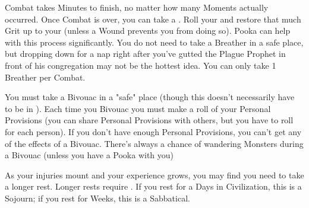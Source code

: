 {  



  Combat takes Minutes to finish, no matter how many Moments actually occurred.  Once Combat is over, you can take a .  Roll your \FLESH and restore that much Grit up to your \MAX (unless a Wound prevents you from doing so).  Pooka can help with this process significantly.  You do not need to take a Breather in a safe place, but dropping down for a nap right after you've gutted the Plague Prophet in front of his congregation may not be the hottest idea.  You can only take 1 Breather per Combat.  


  You must take a Bivouac in a "safe" place (though this doesn't necessarily have to be in ).  Each time you Bivouac you must make a \UD roll of your Personal Provisions (you can share Personal Provisions with others, but you have to roll for each person).  If you don't have enough Personal Provisions, you can't get any of the effects of a Bivouac.  There's always a chance of wandering Monsters during a Bivouac (unless you have a Pooka with you)


  \cbreak



  As your injuries mount and your experience grows,  you may find you need to take a longer rest.  Longer rests require .  If you rest for a Days in Civilization, this is a Sojourn; if you rest for Weeks, this is a Sabbatical. 

} %